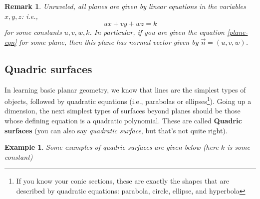 \documentclass[12pt]{article}
\numberwithin{equation}{subsection}
\numberwithin{figure}{subsection}
\theoremstyle{note}
\newtheorem{example}[subsection]{Example}
\newtheorem{remark}[subsection]{Remark}
\begin{document}
{\begin{remark} Unraveled, all planes are given by \textit{linear} equations in the variables $x,y,z$: i.e., \begin{equation} \label{plane-eqn} u x+v y+w z=k \end{equation} for some constants $u,v,w,k$. In particular, if you are given the equation \eqref{plane-eqn} for some plane, then this plane has normal vector given by $\vec{n}=(u,v,w)$.\end{remark}

\subsection{Quadric surfaces}
In learning basic planar geometry, we know that lines are the simplest types of objects, followed by quadratic equations (i.e., parabolas or ellipses\footnote{If you know your conic sections, these are exactly the shapes that are described by quadratic equations: parabola, circle, ellipse, and hyperbola}). Going up a dimension, the next simplest types of surfaces beyond planes should be those whose defining equation is a quadratic polynomial. These are called \textbf{Quadric surfaces} (you can also say \textit{quadratic surface}, but that's not quite right). 

\begin{example}Some examples of quadric surfaces are given below (here $k$ is some constant)


\end{example}}
\end{document}
